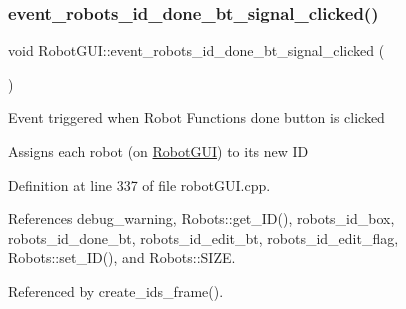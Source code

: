 \subsubsection{\texorpdfstring{event\+\_\+robots\+\_\+id\+\_\+done\+\_\+bt\+\_\+signal\+\_\+clicked()}{event\_robots\_id\_done\_bt\_signal\_clicked()}}
{\footnotesize\ttfamily void Robot\+G\+U\+I\+::event\+\_\+robots\+\_\+id\+\_\+done\+\_\+bt\+\_\+signal\+\_\+clicked (\begin{DoxyParamCaption}{ }\end{DoxyParamCaption})\hspace{0.3cm}{\ttfamily [private]}}

Event triggered when Robot Functions\textquotesingle{} done button is clicked

Assigns each robot (on \hyperlink{class_robot_g_u_i}{Robot\+G\+UI}) to its new ID 

Definition at line 337 of file robot\+G\+U\+I.\+cpp.



References debug\+\_\+warning, Robots\+::get\+\_\+\+I\+D(), robots\+\_\+id\+\_\+box, robots\+\_\+id\+\_\+done\+\_\+bt, robots\+\_\+id\+\_\+edit\+\_\+bt, robots\+\_\+id\+\_\+edit\+\_\+flag, Robots\+::set\+\_\+\+I\+D(), and Robots\+::\+S\+I\+ZE.



Referenced by create\+\_\+ids\+\_\+frame().


